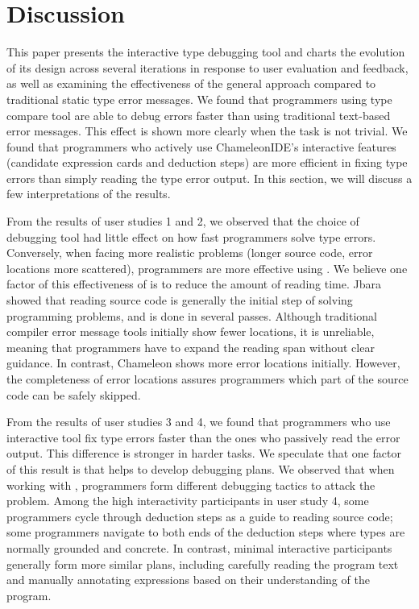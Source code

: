 \section{Discussion}
This paper presents the interactive type debugging tool \chameleon{} and charts the evolution of its design across several iterations in response to user evaluation and feedback, as well as examining the effectiveness of the general approach compared to traditional static type error messages. We found that programmers using \chameleon{} type compare tool are able to debug errors faster than using traditional text-based error messages. This effect is shown more clearly when the task is not trivial. We found that programmers who actively use ChameleonIDE's interactive features (candidate expression cards and deduction steps) are more efficient in fixing type errors than simply reading the type error output. In this section, we will discuss a few interpretations of the results.


From the results of user studies 1 and 2, we observed that the choice of debugging tool had little effect on how fast programmers solve type errors. Conversely, when facing more realistic problems (longer source code, error locations more scattered), programmers are more effective using \chameleon{}. We believe one factor of this effectiveness of \chameleon{} is to reduce the amount of reading time. Jbara \cite{jbara2017programmers} showed that reading source code is generally the initial step of solving programming problems, and is done in several passes. Although traditional compiler error message tools initially show fewer locations, it is unreliable, meaning that programmers have to expand the reading span without clear guidance. In contrast, Chameleon shows more error locations initially. However, the completeness of error locations assures programmers which part of the source code can be safely skipped.


From the results of user studies 3 and 4, we found that programmers who use interactive tool fix type errors faster than the ones who passively read the error output. This difference is stronger in harder tasks. We speculate that one factor of this result is that  \chameleon{} helps to develop debugging plans. We observed that when working with \chameleon{}, programmers form different debugging tactics to attack the problem. Among the high interactivity participants in user study 4, some programmers cycle through deduction steps as a guide to reading source code; some programmers navigate to both ends of the deduction steps where types are normally grounded and concrete. In contrast, minimal interactive participants generally form more similar plans, including carefully reading the program text and manually annotating expressions based on their understanding of the program.


